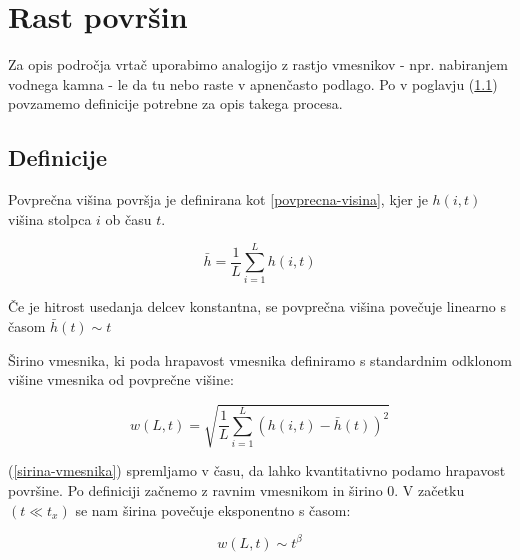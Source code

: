 \documentclass[a4paper, oneside, 12pt]{book}
\begin{document}

        \section{Rast površin}

        Za opis področja vrtač uporabimo analogijo z rastjo vmesnikov - npr. nabiranjem vodnega kamna - le da tu nebo raste v apnenčasto podlago.
        Po \cite{barabasi1995fractal} v poglavju (\ref{definicije}) povzamemo definicije potrebne za opis takega procesa.

        \subsection{Definicije}
        \label{definicije}

        Povprečna višina površja je definirana kot \ref{povprecna-visina}, kjer je $h(i,t)$ višina stolpca $i$ ob času $t$.

        \begin{equation}
          \bar{h} = \frac{1}{L} \sum_{i=1}^L h(i,t)
          \label{povprecna-visina}
        \end{equation}

        Če je hitrost usedanja delcev konstantna, se povprečna višina povečuje linearno s časom $\bar{h}(t) \sim t$

        Širino vmesnika, ki poda hrapavost vmesnika definiramo s standardnim odklonom višine vmesnika od povprečne višine:

        \begin{equation}
          w(L,t) = \sqrt{\frac{1}{L} \sum_{i=1}^L (h(i,t)-\bar{h}(t))^2}
          \label{sirina-vmesnika}
        \end{equation}

        (\ref{sirina-vmesnika}) spremljamo v času, da lahko kvantitativno podamo hrapavost površine. Po definiciji začnemo z ravnim vmesnikom in širino 0. V začetku $(t \ll t_x)$ se nam širina povečuje eksponentno s časom:

        \begin{equation}
          w(L,t) \sim t^\beta
          \label{beta}
        \end{equation}
\end{document}
